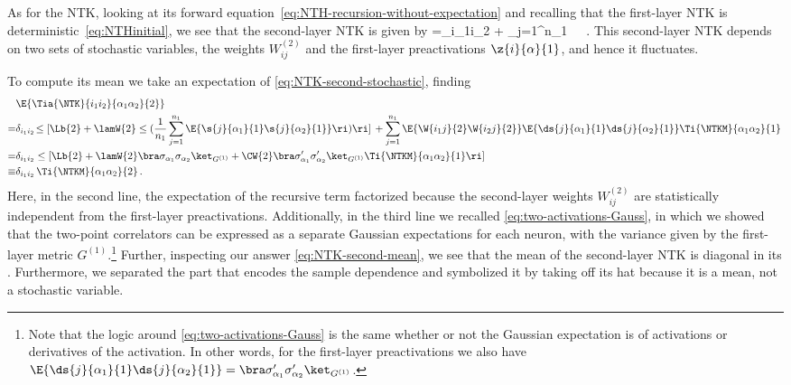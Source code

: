 As for the NTK, looking at its forward equation~\eqref{eq:NTH-recursion-without-expectation} and 
recalling that the first-layer NTK is deterministic~\eqref{eq:NTHinitial}, we see that
the second-layer NTK is given by
\be\label{eq:NTK-second-stochastic}
=\delta_{i_1i_2} \!\le[\Lb{2} + \lamW{2}\le(\frac{1}{n_{1}}\sum_{j=1}^{n_{1}} \s{j}{\alpha_1}{1} \s{j}{\alpha_2}{1}\ri)  \ri] +  \sum_{j=1}^{n_{1}}   \,   \,\, .
\ee
This second-layer NTK depends on two sets of stochastic variables, the weights $W^{(2)}_{ij}$ and the first-layer preactivations $\z{i}{\alpha}{1}$, and hence it fluctuates.

To compute its mean we take an expectation of \eqref{eq:NTK-second-stochastic}, finding
\begin{align}\label{eq:NTK-second-mean}
&\E{\Tia{\NTK}{i_1i_2}{\alpha_1\alpha_2}{2}} \\
=&\delta_{i_1i_2} \!\le[\Lb{2} + \lamW{2}\le(\frac{1}{n_1}\sum_{j=1}^{n_{1}} \E{\s{j}{\alpha_1}{1} \s{j}{\alpha_2}{1}}\ri)\ri]\, \notag +\sum_{j=1}^{n_{1}} \E{\W{i_1j}{2} \W{i_2j}{2}} \E{\ds{j}{\alpha_1}{1} \ds{j}{\alpha_2}{1}}\Ti{\NTKM}{\alpha_1\alpha_2}{1}\, \nonumber\\
=&\delta_{i_1i_2} \le[\Lb{2} + \lamW{2}\bra\sigma_{\alpha_1} \sigma_{\alpha_2}\ket_{G^{(1)}}  +  \CW{2}\bra\sigma^{\prime}_{\alpha_1} \sigma^{\prime}_{\alpha_2}\ket_{G^{(1)}}\Ti{\NTKM}{\alpha_1\alpha_2}{1}\ri] \notag\\
\equiv& \delta_{i_1i_2}\, \Ti{\NTKM}{\alpha_1\alpha_2}{2}\, .\nonumber
\end{align}
Here, in the second line, the expectation of the recursive term
factorized because the second-layer weights $W^{(2)}_{ij}$ are 
statistically independent from the first-layer preactivations. Additionally, in the third line we recalled \eqref{eq:two-activations-Gauss}, in which we showed that the two-point correlators can be expressed as a separate Gaussian expectations 
for each neuron, with the variance given by the first-layer metric $G^{(1)}$.\footnote{Note that the logic around \eqref{eq:two-activations-Gauss} is the same whether or not the Gaussian expectation is of activations or derivatives of the activation. In other words, for the first-layer preactivations we also have $\E{\ds{j}{\alpha_1}{1} \ds{j}{\alpha_2}{1}}= \bra \sigma^{\prime}_{\alpha_1}\sigma^{\prime}_{\alpha_2}\ket_{G^{(1)}}$.}
Further, inspecting our answer \eqref{eq:NTK-second-mean}, we see that the mean of the second-layer NTK is diagonal in its . Furthermore, we separated the part that encodes the sample dependence and symbolized it by taking off its hat because it is a mean, not a stochastic variable.


